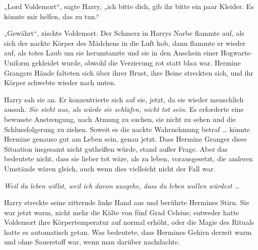 „Lord Voldemort“, sagte Harry, „ich bitte dich, gib ihr bitte ein paar Kleider. Es könnte mir helfen, das zu tun.“

„Gewährt“, zischte Voldemort.
Der Schmerz in Harrys Narbe flammte auf, als sich der nackte Körper des Mädchens in die Luft hob, dann flammte er wieder auf, als totes Laub um sie herumtanzte und sie in den Anschein einer Hogwarts-Uniform gekleidet wurde, obwohl die Verzierung rot statt blau war. Hermine Grangers Hände falteten sich über ihrer Brust, ihre Beine streckten sich, und ihr Körper schwebte wieder nach unten.

Harry sah sie an. Er konzentrierte sich auf sie, jetzt, da sie wieder menschlich aussah.
\emph{Sie sieht aus, als würde sie schlafen, nicht tot sein.} Es erforderte eine bewusste Anstrengung, nach Atmung zu suchen, sie nicht zu sehen und die Schlussfolgerung zu ziehen. Soweit es die nackte Wahrnehmung betraf … könnte Hermine genauso gut am Leben sein, genau jetzt.
Dass Hermine Granger diese Situation insgesamt nicht gutheißen würde, stand außer Frage. Aber das bedeutete nicht, dass sie lieber tot wäre, als zu leben, vorausgesetzt, die anderen Umstände wären gleich, auch wenn dies vielleicht nicht der Fall war.

\emph{Weil du leben willst, weil ich davon ausgehe, dass du leben wollen würdest …}

Harry streckte seine zitternde linke Hand aus und berührte Hermines Stirn. Sie war jetzt warm, nicht mehr die Kälte von fünf Grad Celsius; entweder hatte Voldemort ihre Körpertemperatur auf normal erhöht, oder die Magie des Rituals hatte es automatisch getan. Was bedeutete, dass Hermines Gehirn derzeit warm und ohne Sauerstoff war, wenn man darüber nachdachte.

